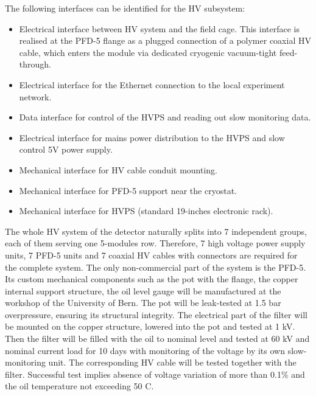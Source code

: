 

The following interfaces can be identified for the HV subsystem:
    \begin{itemize}
        \item Electrical interface between HV system and the field cage. This interface is realised at the PFD-5 flange as a plugged connection of a polymer coaxial HV cable, which enters the module via dedicated cryogenic vacuum-tight feed-through.
        \item Electrical interface  for the Ethernet connection to the local experiment network.
        \item Data interface for control of the HVPS and reading out slow monitoring data.
        \item Electrical interface  for mains power distribution to the HVPS and slow control 5V power supply.
        \item Mechanical interface for HV cable conduit mounting.
        \item Mechanical interface for PFD-5 support near the cryostat.
        \item Mechanical interface for HVPS (standard 19-inches electronic rack).
    \end{itemize}

The whole HV system of the detector naturally splits into 7 independent groups, each of them serving one 5-modules row.
Therefore, 7 high voltage power supply units, 7 PFD-5 units and 7 coaxial HV cables with connectors are required for the complete system. The only non-commercial part of the system is the PFD-5. Its custom mechanical components such as the pot with the flange, the copper internal support structure, the oil level gauge will be manufactured at the workshop of the University of Bern.
The pot will be leak-tested at 1.5 bar overpressure, ensuring its structural integrity. The electrical part of the filter will be mounted on the copper structure, lowered into the pot and tested at 1 kV. Then the filter will be filled with the oil to nominal level and tested at 60 kV and nominal current load for 10 days with monitoring of the voltage by its own slow-monitoring unit. The corresponding HV cable will be tested together with the filter. Successful test implies absence of voltage variation of more than 0.1\% and the oil temperature not exceeding 50 C.


